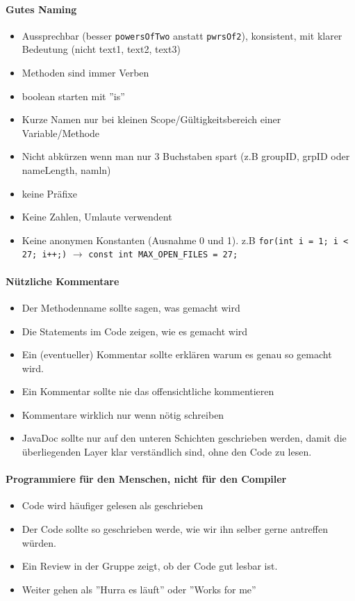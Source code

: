 \paragraph{Gutes Naming}
\begin{itemize}
	\item Aussprechbar (besser \lstinline|powersOfTwo| anstatt \lstinline|pwrsOf2|), konsistent, mit klarer Bedeutung (nicht text1, text2, text3)
	\item Methoden sind immer Verben
	\item boolean starten mit ''is''
	\item Kurze Namen nur bei kleinen Scope/Gültigkeitsbereich einer Variable/Methode
	\item Nicht abkürzen wenn man nur 3 Buchstaben spart (z.B groupID, grpID oder nameLength, namln)
	\item keine Präfixe
	\item Keine Zahlen, Umlaute verwendent
	\item Keine anonymen Konstanten (Ausnahme 0 und 1). z.B \lstinline|for(int i = 1; i < 27; i++;)| $\rightarrow$ \lstinline|const int MAX_OPEN_FILES = 27;|
\end{itemize}
\paragraph{Nützliche Kommentare}
\begin{itemize}
	\item Der Methodenname sollte sagen, was gemacht wird
	\item Die Statements im Code zeigen, wie es gemacht wird
	\item Ein (eventueller) Kommentar sollte erklären warum es genau so gemacht wird.
	\item Ein Kommentar sollte nie das offensichtliche kommentieren
	\item Kommentare wirklich nur wenn nötig schreiben
	\item JavaDoc sollte nur auf den unteren Schichten geschrieben werden, damit die überliegenden Layer klar verständlich sind, ohne den Code zu lesen.
\end{itemize}
\paragraph{Programmiere für den Menschen, nicht für den Compiler}
\begin{itemize}
	\item Code wird häufiger gelesen als geschrieben
	\item Der Code sollte so geschrieben werde, wie wir ihn selber gerne antreffen würden. 
	\item Ein Review in der Gruppe zeigt, ob der Code gut lesbar ist.
	\item Weiter gehen als ''Hurra es läuft'' oder ''Works for me''
\end{itemize}
